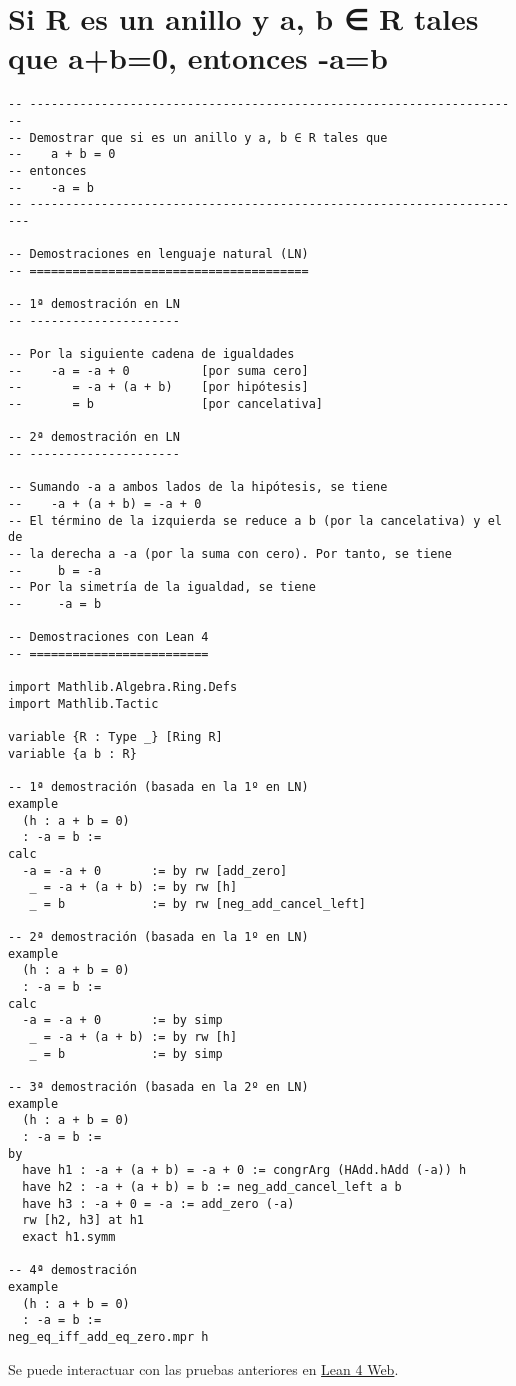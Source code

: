 \section{Si R es un anillo y a, b ∈ R tales que a+b=0, entonces -a=b}
\label{sec:org334f637}
\begin{verbatim}
-- ---------------------------------------------------------------------
-- Demostrar que si es un anillo y a, b ∈ R tales que
--    a + b = 0
-- entonces
--    -a = b
-- ----------------------------------------------------------------------

-- Demostraciones en lenguaje natural (LN)
-- =======================================

-- 1ª demostración en LN
-- ---------------------

-- Por la siguiente cadena de igualdades
--    -a = -a + 0          [por suma cero]
--       = -a + (a + b)    [por hipótesis]
--       = b               [por cancelativa]

-- 2ª demostración en LN
-- ---------------------

-- Sumando -a a ambos lados de la hipótesis, se tiene
--    -a + (a + b) = -a + 0
-- El término de la izquierda se reduce a b (por la cancelativa) y el de
-- la derecha a -a (por la suma con cero). Por tanto, se tiene
--     b = -a
-- Por la simetría de la igualdad, se tiene
--     -a = b

-- Demostraciones con Lean 4
-- =========================

import Mathlib.Algebra.Ring.Defs
import Mathlib.Tactic

variable {R : Type _} [Ring R]
variable {a b : R}

-- 1ª demostración (basada en la 1º en LN)
example
  (h : a + b = 0)
  : -a = b :=
calc
  -a = -a + 0       := by rw [add_zero]
   _ = -a + (a + b) := by rw [h]
   _ = b            := by rw [neg_add_cancel_left]

-- 2ª demostración (basada en la 1º en LN)
example
  (h : a + b = 0)
  : -a = b :=
calc
  -a = -a + 0       := by simp
   _ = -a + (a + b) := by rw [h]
   _ = b            := by simp

-- 3ª demostración (basada en la 2º en LN)
example
  (h : a + b = 0)
  : -a = b :=
by
  have h1 : -a + (a + b) = -a + 0 := congrArg (HAdd.hAdd (-a)) h
  have h2 : -a + (a + b) = b := neg_add_cancel_left a b
  have h3 : -a + 0 = -a := add_zero (-a)
  rw [h2, h3] at h1
  exact h1.symm

-- 4ª demostración
example
  (h : a + b = 0)
  : -a = b :=
neg_eq_iff_add_eq_zero.mpr h
\end{verbatim}
Se puede interactuar con las pruebas anteriores en \href{https://lean.math.hhu.de/\#url=https://raw.githubusercontent.com/jaalonso/Calculemus2/main/src/Opuesto\_ig\_si\_suma\_ig\_cero.lean}{Lean 4 Web}.

